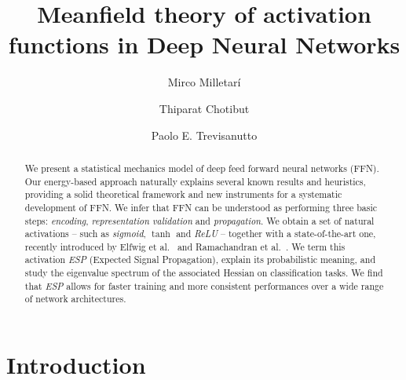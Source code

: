 \documentclass[5p]{elsarticle}
\begin{document}
\begin{frontmatter}

\title{Meanfield theory of activation functions in Deep Neural Networks}

 \author[mirco]{Mirco Milletar\'i }

 \author[thip]{Thiparat Chotibut }

 \author[paolo]{Paolo E. Trevisanutto}



\address[mirco]{Microsoft AI}
\address[thip]{Singapore University of Technology and Design, Singapore.}
\address[paolo]{Graphene Research Centre and CA2DM, National University of Singapore, Singapore. }


\begin{abstract}
We present a statistical mechanics model of deep feed forward neural networks (FFN). Our energy-based approach naturally explains several known results and heuristics,  providing a solid theoretical framework and new instruments for a systematic development of FFN. We infer that FFN can be understood as performing three basic steps: {\it encoding}, { \it representation validation} and {\it propagation}. We obtain a set of natural activations -- such as {\it sigmoid}, $\tanh$ and {\it ReLU} -- together with a state-of-the-art one, recently introduced by Elfwig et al.~\cite{elfwig} and Ramachandran et al.~\cite{prajit}. We term this activation {\it  ESP } (Expected Signal Propagation), explain its probabilistic meaning, and study the eigenvalue spectrum of the associated Hessian on classification tasks. We find that {\it ESP} allows for faster training and more consistent performances over a wide range of network architectures.
\end{abstract}

\begin{keyword}

\end{keyword}

\end{frontmatter}

\linenumbers

\section{Introduction}
\end{document}
